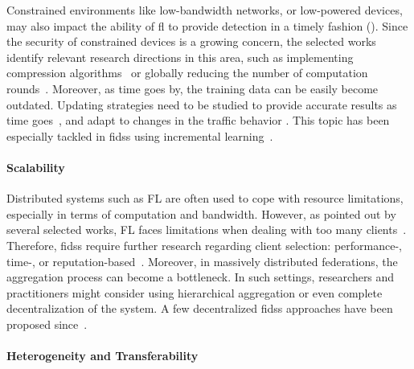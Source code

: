Constrained environments like low-bandwidth networks, or low-powered devices, may also impact the ability of \gls{fl} to provide detection in a timely fashion ().
Since the security of constrained devices is a growing concern, the selected works identify relevant research directions in this area, such as implementing compression algorithms~\cite{fan_IoTDefenderFederatedTransfer_2020} or globally reducing the number of computation rounds~\cite{rahman_InternetThingsIntrusion_2020}.
Moreover, as time goes by, the training data can be easily become outdated.
Updating strategies need to be studied to provide accurate results as time goes~\cite{fan_IoTDefenderFederatedTransfer_2020}, and adapt to changes in the traffic behavior \cite{qin_FederatedLearningBasedNetwork_2021}.
This topic has been especially tackled in \glspl{fids} using incremental learning~\cite{jin_FederatedIncrementalLearning_2023}.


\paragraph{Scalability}

Distributed systems such as FL are often used to cope with resource limitations, especially in terms of computation and bandwidth.
However, as pointed out by several selected works, FL faces limitations when dealing with too many clients~\cite{rathore_BlockSecIoTNetBlockchainbaseddecentralized_2019,fan_IoTDefenderFederatedTransfer_2020}.
Therefore, \glspl{fids} require further research regarding client selection: \mbox{performance-,} \mbox{time-,} or reputation-based~\cite{cunhaneto_FedSBSFederatedLearningparticipantselection_2024}.
Moreover, in massively distributed federations, the aggregation process can become a bottleneck.
In such settings, researchers and practitioners might consider using hierarchical aggregation or even complete decentralization of the system.
A few decentralized \glspl{fids} approaches have been proposed since~\cite{friha_2DFIDSDecentralizeddifferentially_2023}.


\paragraph{Heterogeneity and Transferability}

